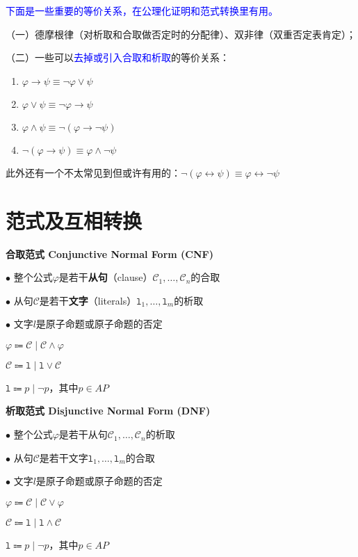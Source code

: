 \documentclass[b5paper,oneside]{ctexbook}
\newcommand{\Blue}[1]{\textcolor[named]{blue}{#1}}
\begin{document}
\Blue{下面是一些重要的等价关系，在公理化证明和范式转换里有用。}\label{equivs}

（一）德摩根律（对析取和合取做否定时的分配律）、双非律（双重否定表肯定）；

（二）一些可以\Blue{去掉或引入合取和析取}的等价关系：
\begin{enumerate}
\item $\varphi\rightarrow\psi\equiv\neg\varphi\lor\psi$
\item $\varphi\lor\psi\equiv\neg\varphi\rightarrow\psi$
\item $\varphi\land\psi\equiv\neg(\varphi\rightarrow\neg\psi)$
\item $\neg(\varphi\rightarrow\psi)\equiv\varphi\land\neg\psi$
\end{enumerate}

此外还有一个不太常见到但或许有用的：$\neg(\varphi\leftrightarrow\psi)\equiv\varphi\leftrightarrow\neg\psi$
\section{范式及互相转换}
\textbf{合取范式 Conjunctive Normal Form (CNF)}

$\bullet$ 整个公式$\varphi$是若干\textbf{从句}（clause）$\mathcal C_{1}, \ldots, \mathcal C_{n}$的合取

$\bullet$ 从句$\mathcal C$是若干\textbf{文字}（literals）$\mathtt l_{1}, \ldots, \mathtt l_{m}$的析取

$\bullet$ 文字$l$是原子命题或原子命题的否定

\begin{center}
$\varphi\Coloneqq\mathcal C\mid\mathcal C\land\varphi$

$\mathcal C\Coloneqq \mathtt l\mid\mathtt l\lor \mathcal C$

$\mathtt l\Coloneqq p\mid \neg p$，其中$p\in AP$
\end{center}

\textbf{析取范式 Disjunctive Normal Form (DNF)}

$\bullet$ 整个公式$\varphi$是若干从句$\mathcal C_{1}, \ldots, \mathcal C_{n}$的析取

$\bullet$ 从句$\mathcal C$是若干文字$\mathtt l_{1}, \ldots, \mathtt l_{m}$的合取

$\bullet$ 文字$l$是原子命题或原子命题的否定

\begin{center}
$\varphi\Coloneqq\mathcal C\mid\mathcal C\lor\varphi$

$\mathcal C\Coloneqq \mathtt l\mid\mathtt l\land \mathcal C$

$\mathtt l\Coloneqq p\mid \neg p$，其中$p\in AP$
\end{center}
\end{document}
